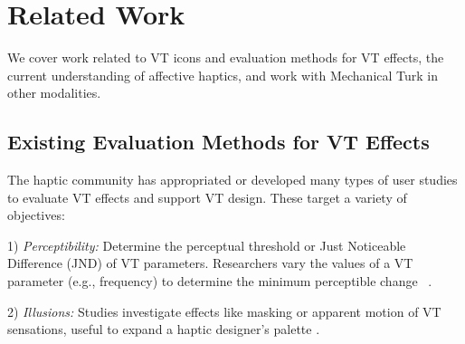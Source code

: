 

\section{Related Work}
We cover work related to VT icons and evaluation methods for VT effects, the current understanding of affective haptics, and work with Mechanical Turk in other modalities.
     
		
\subsection{Existing Evaluation Methods for VT Effects} 

The haptic community has appropriated or developed many types of user studies to evaluate VT effects and support VT design.
These target a variety of objectives:

1) {\em Perceptibility:} Determine the perceptual threshold or Just Noticeable Difference (JND) of VT parameters. Researchers vary the values of a VT parameter (e.g., frequency)
to determine the minimum perceptible change
~\cite{JNDstudy,foundationsoftactile}. 

2) {\em Illusions:} Studies investigate effects like masking or apparent motion of VT sensations, useful to expand a haptic designer's palette \cite{Hayward2008,Israr2011a,Seo2013}.

